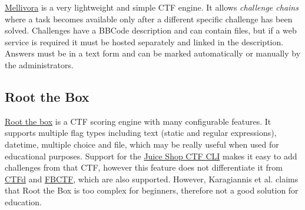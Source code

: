 \href{https://github.com/Nakiami/mellivora}{Mellivora} is a very lightweight and simple CTF engine. It allows \textit{challenge chains} where a task becomes available only after a different specific challenge has been solved. Challenges have a BBCode description and can contain files, but if a web service is required it must be hosted separately and linked in the description. Answers must be in a text form and can be marked automatically or manually by the administrators.

\subsection{Root the Box}

\href{https://github.com/moloch--/RootTheBox}{Root the box} is a CTF scoring engine with many configurable features. It supports multiple flag types including text (static and regular expressions), datetime, multiple choice and file, which may be really useful when used for educational purposes. Support for the \href{https://github.com/juice-shop/juice-shop-ctf}{Juice Shop CTF CLI} makes it easy to add challenges from that CTF, however this feature does not differentiate it from \hyperref[ssec:CTFd]{CTFd} and \hyperref[ssec:FBCTF]{FBCTF}, which are also supported. However, Karagiannis et al. \cite{bib:CTF-analysis} claims that Root the Box is too complex for beginners, therefore not a good solution for education.
